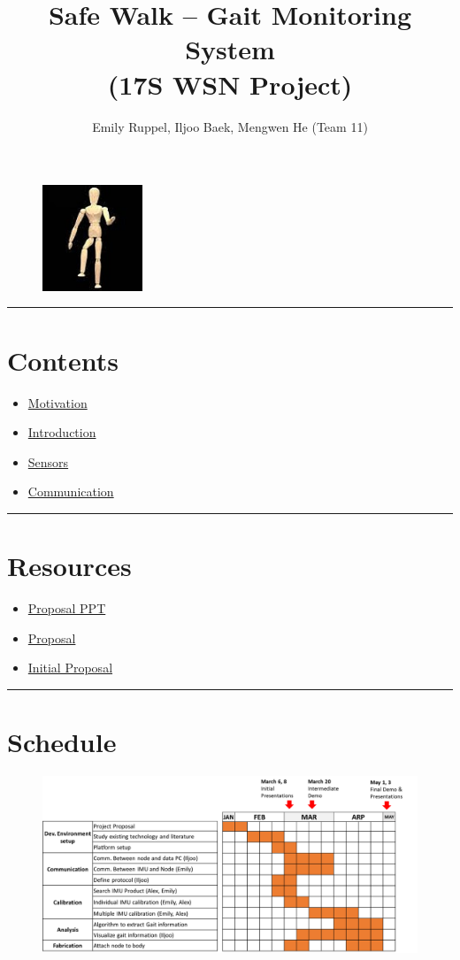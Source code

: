 \documentclass[letterpaper,12pt]{article}
\title{\textbf{Safe Walk -- Gait Monitoring System\\\small (17S WSN Project)}}
\author{Emily Ruppel, Iljoo Baek, Mengwen He (Team 11)}
\newcommand{\panhline}{\begin{center}\rule{\textwidth}{1pt}\end{center}}
\begin{document}
\maketitle

\begin{figure}[!h]
	\centering
	\includegraphics[width=3cm]{./imgs/marven.jpg}
\end{figure}

\panhline
\section{Contents}
\begin{itemize}
	\item \href{./Motivation/document.html}{Motivation}
	\item \href{./Introduction/document.html}{Introduction}
	\item \href{./Sensors/document.html}{Sensors}
	\item \href{./Communication/document.html}{Communication}
\end{itemize}

\panhline
\section{Resources}
\begin{itemize}
	\item \href{./PDFs/GaitMonitoring_Feb-24-17_v0.1.pdf}{Proposal PPT}
	\item \href{./PDFs/proposal_grp11.pdf}{Proposal}
	\item \href{./PDFs/GaitMonitoring_Mar-08-17_v0.4.pdf}{Initial Proposal}
\end{itemize}

\panhline
\section{Schedule}

\begin{figure}[!h]
	\centering
	\includegraphics[width=15cm]{./imgs/schedule.png}
\end{figure}
\end{document}
